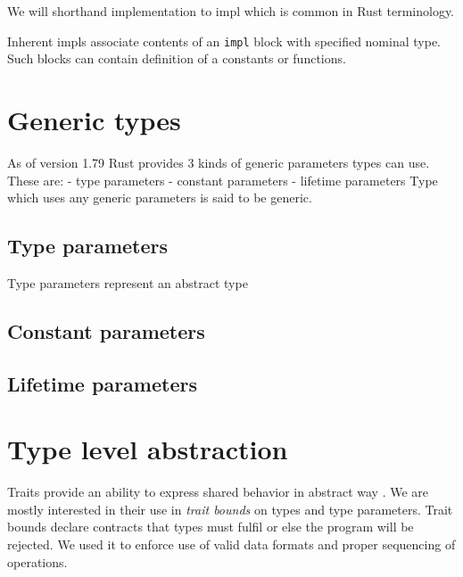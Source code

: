 We will shorthand implementation to impl which is common in Rust terminology.

Inherent impls associate contents of an \texttt{impl} block with specified nominal type.
Such blocks can contain definition of a constants or functions. 

\section{Generic types}

As of version 1.79 Rust provides 3 kinds of generic parameters types can use. 
These are:
- type parameters
- constant parameters
- lifetime parameters
Type which uses any generic parameters is said to be generic.

\subsection{Type parameters}

Type parameters represent an abstract type 

\subsection{Constant parameters}


\subsection{Lifetime parameters}


\section{Type level abstraction}

Traits provide an ability to express shared behavior in abstract way \cite{rustbook}. We are mostly interested in their use in \textit{trait bounds} on types and type parameters.
Trait bounds declare contracts that types must fulfil or else the program will be rejected. 
We used it to enforce use of valid data formats and proper sequencing of operations.


